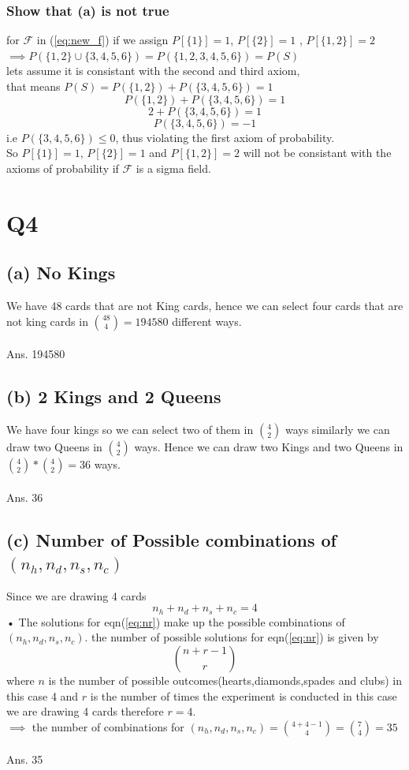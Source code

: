 \documentclass[a4paper,11pt]{article}
\begin{document}
\subsubsection*{Show that (a) is not true}
for $\mathcal{F}$ in (\ref{eq:new_f}) if we assign  $P[\{1\}]=1$, $P[\{2\}]=1$ , $P[\{1,2\}]=2$\\
$\implies P(\{1,2\} \cup \{3,4,5,6\})= P(\{1,2,3,4,5,6\})=P(S)$ \\
lets assume  it is consistant with the second and third axiom,\\ that means $P(S)= P(\{1,2\})+P(\{3,4,5,6\})=1$\\
 $$P(\{1,2\})+P(\{3,4,5,6\}) = 1$$
 $$2+ P(\{3,4,5,6\}) = 1 $$
 $$ P(\{3,4,5,6\}) = -1 $$
 i.e $P(\{3,4,5,6\}) \le 0$, thus violating the first axiom of probability.\\
 So $P[\{1\}]=1$, $P[\{2\}]=1$ and $P[\{1,2\}]=2$ will not be consistant with the  axioms of probability if $\mathcal{F}$ is a sigma field.
 
\newpage
\section*{Q4}
\subsection*{(a) No Kings}
We have 48 cards that are not King cards, hence we can select four cards that are not king cards in ${48 \choose 4} = 194580 $  different ways. \\\\
Ans. 194580
\subsection*{(b) 2 Kings and 2 Queens}
We have four kings so we can select two of them in ${ 4 \choose 2}$ ways similarly we can draw two Queens in  ${ 4 \choose 2}$ ways. Hence we can draw two Kings and two Queens in ${ 4 \choose 2}*{ 4 \choose 2}=36$ ways.\\\\
Ans. 36

\subsection*{(c) Number of Possible combinations of $(n_h,n_d,n_s,n_c)$}

Since we are drawing 4 cards 
\begin{equation}\label{eq:nr}
n_h+n_d+n_s+n_c = 4
\end{equation}•
The solutions for eqn(\ref{eq:nr}) make up the possible combinations of $(n_h,n_d,n_s,n_c)$.
the number of possible  solutions for eqn(\ref{eq:nr}) is given by $${{n+r-1} \choose r}$$
where $n$ is the number of possible outcomes(hearts,diamonds,spades and clubs) in this case 4 and $r$ is the number of times the experiment is conducted in this case we are drawing 4 cards therefore $r = 4$.\\
$\implies$ the number of combinations for $(n_h,n_d,n_s,n_c) = {{4+4-1} \choose 4}={7 \choose 4} = 35$\\\\
Ans. 35
\end{document}
